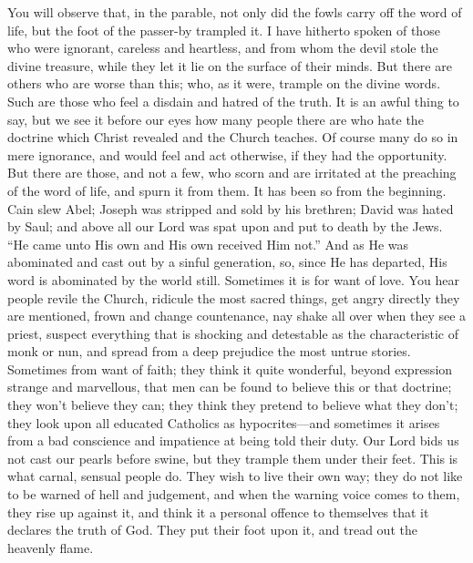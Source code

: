 You will observe that, in the parable, not only
did the fowls carry off the word of life, but the foot of the
passer-by trampled it. I have hitherto spoken of those who were
ignorant, careless and heartless, and from whom the devil stole the
divine treasure, while they let it lie on the surface of their minds.
But there are others who are worse than this; who, as it were, trample
on the divine words. Such are those who feel a disdain and hatred
of the truth. It is an awful thing to say, but we see it before our
eyes how many people there are who hate the doctrine which Christ
revealed and the Church teaches. Of course many do so in mere
ignorance, and would feel and act otherwise, if they had the
opportunity. But there are those, and not a few, who scorn and are
irritated at the preaching of the word of life, and spurn it from
them. It has been so from the beginning. Cain slew Abel; Joseph was
stripped and sold by his brethren; David was hated by Saul; and above
all our Lord was spat upon and put to death by the Jews. ``He came
unto His own and His own received Him not.'' And as He was abominated
and cast out by a sinful generation, so, since He has departed, His
word is abominated by the world still. Sometimes it is for want of
love. You hear people revile the Church, ridicule the most sacred
things, get angry directly they are mentioned, frown and change
countenance, nay shake all over when they see a priest, suspect
everything that is shocking and detestable as the characteristic of
monk or nun, and spread from a deep prejudice the most untrue stories.
Sometimes from want of faith; they think it quite wonderful, beyond
expression strange and marvellous, that men can be found to believe
this or that doctrine; they won't believe they can; they think they
pretend to believe what they don't; they look upon all educated
Catholics as hypocrites—and sometimes it arises from a bad
conscience and impatience at being told their duty. Our Lord bids us
not cast our pearls before swine, but they trample them under their
feet. This is what carnal, sensual people do. They wish to live their
own way; they do not like to be warned of hell and judgement, and when
the warning voice comes to them, they rise up against it, and think it
a personal offence to themselves that it declares the truth of God.
They put their foot upon it, and tread out the heavenly flame.

